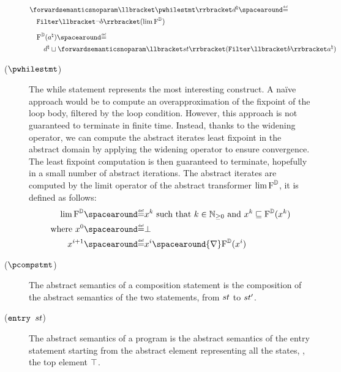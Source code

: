 \begin{description}
{\begin{align*}
      &\forwardsemanticsnoparam \semanticsof{\pwhilestmt}\defabstractvalue \DefeQ \\
      &\quad \abstractdomainfilter \semanticsof{\neg\defbexp} (\lim \abstractdomaintransformer) \\[5pt]
      &\quad \abstractdomaintransformer (\defotherabstractvalue) \DefeQ \\
      &\qquad\defabstractvalue \abstractdomainjoin \forwardsemanticsnoparam \semanticsof{\defstmt}(\abstractdomainfilter \semanticsof{\defbexp}\defotherabstractvalue)
    \end{align*}
  }
  \item[\normalfont ($\pwhilestmt$)] The while statement represents the most interesting construct. A na\"ive approach would be to compute an overapproximation of the fixpoint of the loop body, filtered by the loop condition. However, this approach is not guaranteed to terminate in finite time. Instead, thanks to the widening operator, we can compute the abstract iterates least fixpoint in the abstract domain by applying the widening operator to ensure convergence. The least fixpoint computation is then guaranteed to terminate, hopefully in a small number of abstract iterations.
  The abstract iterates are computed by the limit operator of the abstract transformer $\lim \textup{F}^{\mathbb{D}}$, it is defined as follows:
  \begin{align*}
    \lim \abstractdomaintransformer &\DefeQ x^k \text{ such that } k\in\Npos \text{ and } x^k \abstractdomainsubseteq \abstractdomaintransformer(x^k) \\
    \text{where } x^0 &\DefeQ \abstractdomainbottom \\
    x^{i+1} &\DefeQ x^i \spacearound{\abstractdomainwidening} \abstractdomaintransformer(x^i)
  \end{align*}
  \item[\normalfont ($\pcompstmt$)] The abstract semantics of a composition statement is the composition of the abstract semantics of the two statements, from $st$ to $st'$.
  \item[\normalfont ($\textup{\texttt{entry }} st$)] The abstract semantics of a program is the abstract semantics of the entry statement starting from the abstract element representing all the states, \ie, the top element $\top$.

\end{description}
